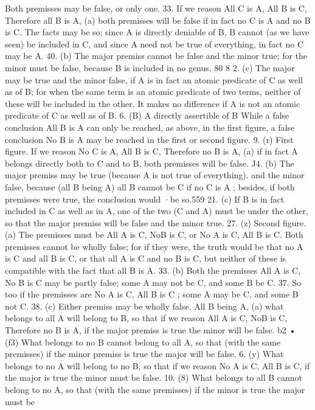 {{{{{{{{{{{{{{Both premisses may be false, or only one.
33. If we reason All C is A, All B is C, Therefore all B is A,
(a) both premisses will be false if in fact no C is A and no B is C.
The facts may be so; since A is directly deniable of B, B cannot
(as we have seen) be included in C, and since A need not be true
of everything, in fact no C may be A.
40. (b) The major premiss cannot be false and the minor true;
for the minor must be false, because B is included in no genus.
80 8 2. (c) The major may be true and the minor false, if A is
in fact an atomic predicate of C as well as of B; for when the
same term is an atomic predicate of two terms, neither of these
will be included in the other. It makes no difference if A is
not an atomic predicate of C as well as of B.
6.
(B) A directly assertible of B
While a false conclusion All B is A can only be reached, as
above, in the first figure, a false conclusion No B is A may be
reached in the first or second figure.
9. (r) First figure. If we reason No C is A, All B is C, Therefore
no B is A, (a) if in fact A belongs directly both to C and to B,
both premisses will be false.
J4. (b) The major premiss may be true (because A is not true
of everything). and the minor false, because (all B being A)
all B cannot be C if no C is A ; besides, if both premisses were
true, the conclusion would ·be so.559
21.
(c) If B is in fact included in C as well as in A, one of the
two (C and A) must be under the other, so that the major premiss
will be false and the minor true.
27. (z) Second figure. (a) The premisses must be All A is C,
NoB is C, or No A is C, All B is C. Both premisses cannot be
wholly false; for if they were, the truth would be that no A is C
and all B is C, or that all A is C and no B is C, but neither of
these is compatible with the fact that all B is A.
33. (b) Both the premisses All A is C, No B is C may be partly
false; some A may not be C, and some B be C.
37. So too if the premisses are No A is C, All B is C ; some A
may be C, and some B not C.
38. (c) Either premiss may be wholly false. All B being A,
(a) what belongs to all A will belong to B, so that if we reason
All A is C, NoB is C, Therefore no B is A, if the major premiss
is true the minor will be false.
b2 • (f3) What belongs to no B cannot belong to all A, so that
(with the same premisses) if the minor premiss is true the major
will be false.
6. (y) What belongs to no A will belong to no B, so that if we
reason No A is C, All B is C, if the major is true the minor must
be false.
10. (8) What belongs to all B cannot belong to no A, so that
(with the same premisses) if the minor is true the major must be
}}}}}}}}}}}}}}
